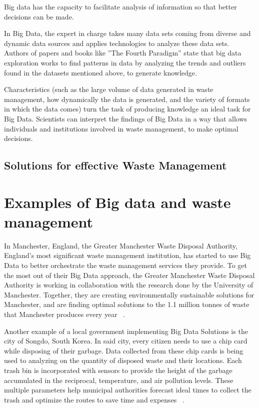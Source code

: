 \documentclass[sigconf]{acmart}
\begin{document}
Big data has the capacity to facilitate analysis of information so that better decisions can be made.

In Big Data, the expert in charge takes many data sets coming from diverse and dynamic data sources and applies technologies to analyze these data sets.  Authors of papers and books like ''The Fourth Paradigm'' state that big data exploration works to find patterns in data by analyzing the trends and outliers found in the datasets mentioned above, to generate knowledge. ~\cite{hey2009fourth}

Characteristics (such as the large volume of data generated in waste management, how dynamically the data is generated, and the variety of formats in which the data comes) turn the task of producing knowledge an ideal task for Big Data.  Scientists can interpret the findings of Big Data  in a way that allows individuals and institutions involved in waste management, to make optimal decisions.~\cite{yenkar2014review}  

\subsection{Solutions for effective Waste Management}

\section{ Examples of Big data and waste management}

In Manchester, England, the Greater Manchester Waste Disposal Authority, England's most significant waste management institution, has started to use Big Data to better orchestrate the waste management services they provide. To get the most out of their Big Data approach, the Greater Manchester Waste Disposal Authority is working in collaboration with the research done by the University of Manchester. Together, they are creating environmentally sustainable solutions for Manchester, and are finding optimal solutions to the 1.1 million tonnes of waste that Manchester produces every year ~\cite{markvan2016}. 

Another example of a local government implementing Big Data Solutions is the city of  Songdo, South Korea. In said city, every citizen needs to use a chip card while disposing of their garbage. Data collected from these chip cards is being used to analyzing on the quantity of disposed waste and their locations. Each trash bin is incorporated with sensors to provide the height of the garbage accumulated in the reciprocal, temperature, and air pollution levels. These multiple parameters help municipal authorities forecast ideal times to collect the trash and optimize the routes to save time and expenses ~\cite{markvan2016}.
\end{document}
